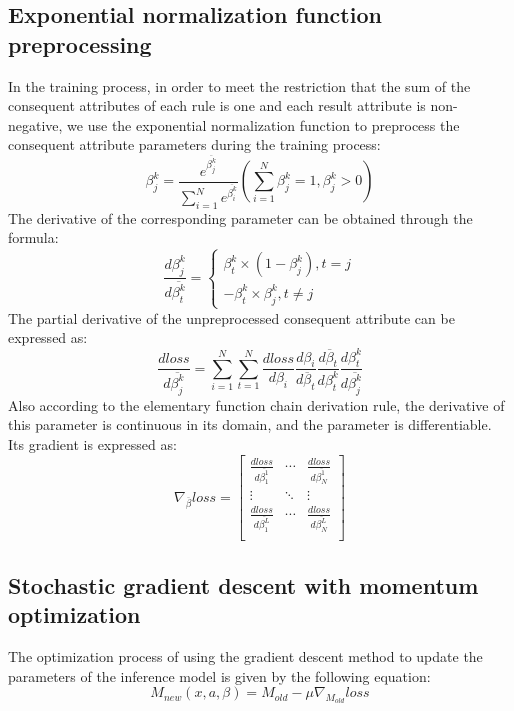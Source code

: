 \documentclass{ieeeaccess}
\begin{document}
\subsection{Exponential normalization function preprocessing}
In the training process, in order to meet the restriction that the sum of the consequent attributes of each rule is one and each result attribute is non-negative,
we use the exponential normalization function to preprocess the consequent attribute parameters during the training process:
\begin{equation}
    \beta_j^k=\frac{e^{\overline{\beta_j^k}}}{\sum_{i=1}^Ne^{\overline{\beta_i^k}}}(\sum_{i=1}^N\beta_j^k=1,\beta_j^k>0)
\end{equation}
The derivative of the corresponding parameter can be obtained through the formula:
\begin{equation}
    \frac{d\beta_j^k}{d\overline{\beta_t^k}}=
    \left\{
    \begin{aligned}
        \beta_t^k\times(1-\beta_j^k),t=j \\
        -\beta_t^k\times\beta_j^k,t\neq j
    \end{aligned}
    \right.
\end{equation}
The partial derivative of the unpreprocessed consequent attribute can be expressed as:
\begin{equation}
    \frac{dloss}{d\overline{\beta_j^k}}=\sum_{i=1}^N\sum_{t=1}^N\frac{dloss}{d\beta_i}\frac{d\beta_i}{d\overline{\beta}_t}\frac{d\overline{\beta}_t}{d\beta_t^k}\frac{d\beta_t^k}{d\overline{\beta_j^k}}
\end{equation}
Also according to the elementary function chain derivation rule, the derivative of this parameter is continuous in its domain,
and the parameter is differentiable. Its gradient is expressed as:
\begin{equation}
    \nabla_{\overline{\beta}}loss=\left[\begin{matrix}
            \frac{dloss}{d\overline{\beta_1^1}} & \cdots & \frac{dloss}{d\overline{\beta_N^1}} \\
            \vdots                              & \ddots & \vdots                              \\
            \frac{dloss}{d\overline{\beta_1^L}} & \cdots & \frac{dloss}{d\overline{\beta_N^L}} \\
        \end{matrix}\right]
\end{equation}


\subsection{Stochastic gradient descent with momentum optimization}
The optimization process of using the gradient descent method to update the parameters of the inference model is given by the following equation:
\begin{equation}
    M_{new}(x,a,\beta)=M_{old}-\mu\nabla_{M_{old}}loss
\end{equation}
\end{document}

